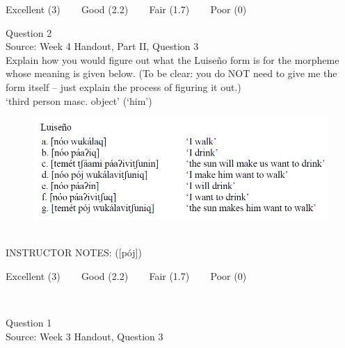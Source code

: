 \documentclass[12pt]{article}
\begin{document}
\vfill
Excellent (3) ~~~ Good (2.2) ~~~ Fair (1.7) ~~~ Poor (0)
\newpage

{\large Question 2}\\

Source: Week 4 Handout, Part II, Question 3\\

Explain how you would figure out what the Luiseño form is for the morpheme whose meaning is given below. (To be clear: you do NOT need to give me the form itself -- just explain the process of figuring it out.)\\

‘third person masc. object’ (‘him’)

\begin{figure}[H]
\includegraphics{../images/luiseno.png}
\end{figure}

~\\
INSTRUCTOR NOTES: ([pój])


\vfill
Excellent (3) ~~~ Good (2.2) ~~~ Fair (1.7) ~~~ Poor (0)
\newpage

\begin{center}
\textbf{{\color{red}{\HUGE END OF EXAM}}}\\

\end{center}
\newpage

\begin{center}
\textbf{{\color{blue}{\HUGE START OF EXAM\\}}}

\textbf{{\color{blue}{\HUGE Student ID: 74654\\}}}

\textbf{{\color{blue}{\HUGE 4:40\\}}}

\end{center}
\newpage

{\large Question 1}\\

Source: Week 3 Handout, Question 3\\
\end{document}
